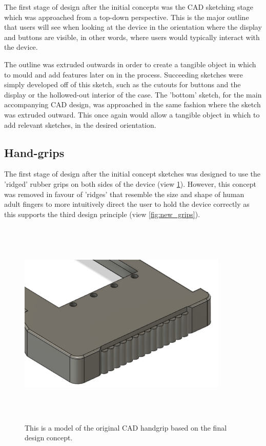 The first stage of design after the initial concepts was the CAD sketching stage which was approached from a top-down perspective.
This is the major outline that users will see when looking at the device in the orientation where the display and buttons are visible, in other words, where users would typically interact with the device.

The outline was extruded outwards in order to create a tangible object in which to mould and add features later on in the process.
Succeeding sketches were simply developed off of this sketch, such as the cutouts for buttons and the display or the hollowed-out interior of the case.
The 'bottom' sketch, for the main accompanying CAD design, was approached in the same fashion where the sketch was extruded outward.
This once again would allow a tangible object in which to add relevant sketches, in the desired orientation.

\subsection{Hand-grips}

The first stage of design after the initial concept sketches was designed to use the 'ridged' rubber grips on both sides of the device (view \ref{fig:old_grips}).
However, this concept was removed in favour of 'ridges' that resemble the size and shape of human adult fingers to more intuitively direct the user to hold the device correctly as this supports the third design principle (view \ref{fig:new_grips}).

\begin{figure} [h]
    \centering
    \includegraphics[width=10cm,height=10cm,keepaspectratio]{Figures/handgrip_original.png}
    \caption{This is a model of the original CAD handgrip based on the final design concept.}
    \label{fig:old_grips}
\end{figure}

